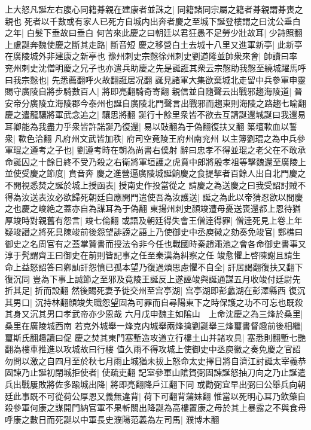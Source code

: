 上大怒凡誕左右腹心同籍朞親在建康者並誅之|{
	同籍諸同宗屬之籍者朞親謂朞喪之親也}
死者以千數或有家人已死方自城内出奔者慶之至城下誕登樓謂之曰沈公垂白之年|{
	白髮下垂故曰垂白}
何苦來此慶之曰朝廷以君狂愚不足勞少壯故耳|{
	少詩照翻}
上慮誕奔魏使慶之斷其走路|{
	斷音短}
慶之移營白土去城十八里又進軍新亭|{
	此新亭在廣陵城外非建康之新亭也}
豫州刺史宗慤徐州刺史劉道隆並帥衆來會|{
	帥讀曰率}
兖州刺史沈僧明慶之兄子也亦遣兵助慶之先是誕誑其衆云宗慤助我慤至繞城躍馬呼曰我宗慤也|{
	先悉薦翻呼火故翻誑居况翻}
誕見諸軍大集欲棄城北走留中兵參軍申靈賜守廣陵自將步騎數百人|{
	將即亮翻騎奇寄翻}
親信並自隨聲云出戰邪趨海陵道|{
	晉安帝分廣陵立海陵郡今泰州也誕自廣陵北門聲言出戰邪而趨東則海陵之路趨七喻翻}
慶之遣龍驤將軍武念追之|{
	驤思將翻}
誕行十餘里衆皆不欲去互請誕還城誕曰我還易耳卿能為我盡力乎衆皆許諾誕乃復還|{
	易以䜴翻為于偽翻復扶又翻}
築壇㰱血以誓衆|{
	㰱色洽翻}
凡府州文武皆加秩|{
	府司空竟陵王府州南兖州}
以主簿劉琨之為中兵參軍琨之遵考之子也|{
	劉遵考時在朝為尚書右僕射}
辭曰忠孝不得並琨之老父在不敢承命誕囚之十餘日終不受乃殺之右衛將軍垣護之虎賁中郎將殷孝祖等擊魏還至廣陵上並使受慶之節度|{
	賁音奔}
慶之進營逼廣陵城誕餉慶之食提挈者百餘人出自北門慶之不開視悉焚之誕於城上授函表|{
	授南史作投當從之}
請慶之為送慶之曰我受詔討賊不得為汝送表汝必欲歸死朝廷自應開門遣使吾為汝護送|{
	誕之為此以帝猜忍欲以間慶之也慶之峻絶之蓋亦自為謀耳為于偽翻}
東揚州刺史顔竣遭母憂送喪還都上恩待猶厚竣時對親舊有怨言|{
	竣七倫翻}
或語及朝廷得失會王僧逹得罪|{
	僧逹死見上卷上年}
疑竣譖之將死具陳竣前後怨望誹謗之語上乃使御史中丞庾徽之劾奏免竣官|{
	鄭樵曰御史之名周官有之蓋掌贊書而授法令非今任也戰國時秦趙澠池之會各命御史書事又淳于髠謂齊王曰御史在前則皆記事之任至秦漢為糾察之任}
竣愈懼上啓陳謝且請生命上益怒詔答曰卿訕訐怨憤已孤本望乃復過煩思慮懼不自全|{
	訐居謁翻復扶又翻下復沉同}
豈為下事上誠節之至邪及竟陵王誕反上遂誣竣與誕通謀五月收竣付廷尉先折其足|{
	折而設翻}
然後賜死妻予徙交州至宫亭湖|{
	宫亭湖即彭蠡湖在彭澤縣西}
復沉其男口|{
	沉持林翻顔竣失職怨望固為可罪而自尋陽東下之時保護之功不可忘也既殺其身又沉其男口孝武帝亦少恩哉}
六月戊申魏主如隂山　上命沈慶之為三烽於桑里|{
	桑里在廣陵城西南}
若克外城舉一烽克内城舉兩烽擒劉誕舉三烽璽書督趣前後相繼|{
	璽斯氏翻趣讀曰促}
慶之焚其東門塞塹造攻道立行樓土山并諸攻具|{
	塞悉則翻塹七艷翻為樓車推進以攻城故曰行樓}
值久雨不得攻城上使御史中丞庾徽之奏免慶之官詔勿問以激之自四月至於秋七月雨止城猶未拔上怒命太史擇日將自濟江討誕太宰義恭固諫乃止誕初閉城拒使者|{
	使疏吏翻}
記室參軍山隂賀弼固諫誕怒抽刀向之乃止誕遣兵出戰屢敗將佐多踰城出降|{
	將即亮翻降戶江翻下同}
或勸弼宜早出弼曰公舉兵向朝廷此事既不可從荷公厚恩又義無違背|{
	荷下可翻背蒲妹翻}
惟當以死明心耳乃飲藥自殺參軍何康之謀開門納官軍不果斬關出降誕為高樓置康之母於其上暴露之不與食母呼康之數日而死誕以中軍長史濮陽范義為左司馬|{
	濮博木翻}
